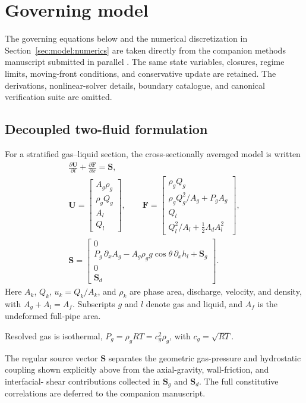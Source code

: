\section{Governing model}
\label{sec:model}

The governing equations below and the numerical discretization in
Section~\ref{sec:model:numerics} are taken directly from the companion methods
manuscript submitted in parallel \cite{xue2026model}.
The same state variables, closures, regime limits, moving-front conditions,
and conservative update are retained. The derivations, nonlinear-solver
details, boundary catalogue, and canonical verification suite are omitted.
\subsection{Decoupled two-fluid formulation}
\label{sec:model:framework}

For a stratified gas--liquid section, the cross-sectionally averaged model is
written
\begin{equation}
\begin{gathered}
\frac{\partial\mathbf U}{\partial t}
+\frac{\partial\mathbf F}{\partial x}=\mathbf S,\\[2pt]
\mathbf U=
\begin{bmatrix}
A_g\rho_g\\ \rho_gQ_g\\ A_l\\ Q_l
\end{bmatrix},
\qquad
\mathbf F=
\begin{bmatrix}
\rho_gQ_g\\
\rho_gQ_g^2/A_g+P_gA_g\\
Q_l\\
Q_l^2/A_l+\tfrac12\Lambda_dA_l^2
\end{bmatrix},\\[3pt]
\mathbf S=
\begin{bmatrix}
0\\
P_g\,\partial_xA_g-A_g\rho_g g\cos\theta\,\partial_xh_l+\mathbf S_g\\
0\\
\mathbf S_d
\end{bmatrix}.
\end{gathered}
\label{eq:system}
\end{equation}
Here $A_k$, $Q_k$, $u_k=Q_k/A_k$, and $\rho_k$ are phase area,
discharge, velocity, and density, with $A_g+A_l=A_f$. Subscripts $g$ and $l$
denote gas and liquid, and $A_f$ is the undeformed full-pipe area.\par
\begin{samepage}
\noindent Resolved gas is isothermal, $P_g=\rho_gRT=c_g^2\rho_g$, with
$c_g=\sqrt{RT}$.
\end{samepage}
The regular source vector
$\mathbf S$ separates the geometric gas-pressure and hydrostatic coupling
shown explicitly above from the axial-gravity, wall-friction, and interfacial-
shear contributions collected in $\mathbf S_g$ and $\mathbf S_d$. The full
constitutive correlations are deferred to the companion manuscript.

